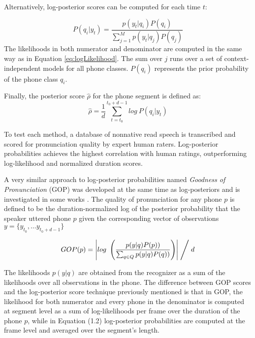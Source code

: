 Alternatively, log-posterior scores can be computed for each time $t$:

\begin{equation}
P(q_{i}|y_{t}) = \frac{p(y_{t}|q_{i})P(q_{i})}{\sum\limits_{j=1}^{M} p(y_{t}|q_{j})P(q_{j})}
\end{equation}
The likelihoods in both numerator and denominator are computed in the same way as in 
Equation \ref{eq:logLikelihood}. 
The sum over $j$ runs over a set of context-independent models for all phone classes. $P(q_{i})$
represents the prior probability of the phone class $q_{i}$. 

Finally, the posterior score $\hat{\rho}$ for the phone segment is defined as:
\begin{equation}
\hat{\rho} = \frac{1}{d}\sum_{t=t_{0}}^{t_{0}+d-1} log \ P(q_{i}|y_{t})
\end{equation}

To test each method, a database of nonnative read speech is transcribed and scored for 
pronunciation quality by expert human raters. Log-posterior probabilities achieves the
highest correlation with human ratings, outperforming log-likelihood and normalized duration
scores.

A very similar approach to log-posterior probabilities named \textit{Goodness of Pronunciation}
(GOP) was developed at the same time as log-posteriors and
is investigated in some works \cite{gop_1, gop_2, gop_3}. The quality of 
pronunciation for any phone $p$ is defined to be the duration-normalized log of the posterior
probability that the speaker uttered phone $p$ given the corresponding vector of observations
$y=\{y_{t_{0}}, \dotsc y_{t_{0}+d-1} \}$

\begin{equation}
\label{eq:gopScore}
GOP(p) = \left| log \ \left(\frac{p(y|q)P(p))}{\sum_{q \in Q}p(y|q)P(q))}\right) \right| \Biggm/ d 
\end{equation}

The likelihoods $p(y|q)$ are obtained from the recognizer as a sum of the likelihoods over all
observations in the phone.
The difference between GOP scores and the log-posterior score technique previously mentioned 
is that in GOP, the likelihood for both numerator and every phone in the denominator is
computed at segment level as a sum of log-likelihoods per frame over the 
duration of the phone $p$, while in Equation (1.2) log-posterior probabilities are computed
at the frame level and averaged over the segment's length.

